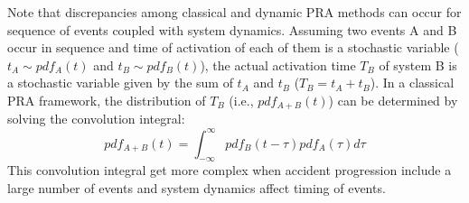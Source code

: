 Note that discrepancies among classical and dynamic PRA methods can occur for sequence of 
events coupled with system dynamics.
Assuming two events A and B occur in sequence and time of activation of each of them is a stochastic variable 
($t_A \sim pdf_A(t)$ and $t_B \sim pdf_B(t)$), the actual activation time $T_B$ of system B is a stochastic 
variable given by the sum of $t_A$ and $t_B$ ($T_B = t_A + t_B$). 
In a classical PRA framework, the distribution of $T_B$ (i.e., $pdf_{A+B}(t)$) can be 
determined by solving the convolution integral:   
\begin{equation}
  pdf_{A+B}(t) = \int_{-\infty}^{\infty} pdf_B(t-\tau) pdf_A(\tau) d\tau
  \label{eq:trajectory}
\end{equation}
This convolution integral get more complex when accident progression include a large number of events and 
system dynamics affect timing of events.




